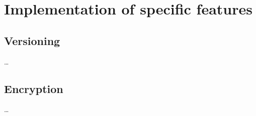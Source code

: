\chapter{Implementation of specific features}

\section{Versioning}

\ldots

\section{Encryption}

\ldots